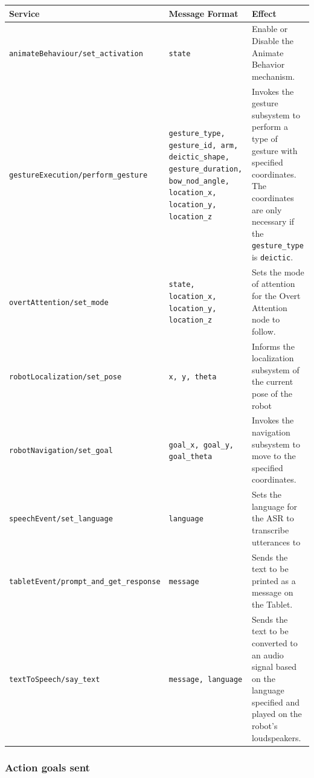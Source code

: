 \documentclass{CSSRforAfrica}
\begin{document}
\begin{center}
\begin{tabularx}{\linewidth}{| p{6.5cm} | p{3cm} | X |}
\hline 
{\small Service }                               & {\small Message Format }                            &  {\small Effect}       \\
\hline
{\footnotesize \verb+animateBehaviour/set_activation+}  & {\footnotesize \texttt{state}}    & {\small Enable or Disable the Animate Behavior mechanism.} \\ 
\hline
{\footnotesize \verb+gestureExecution/perform_gesture+}  & {\footnotesize \texttt{gesture\_type, gesture\_id, arm, deictic\_shape, gesture\_duration, bow\_nod\_angle, location\_x, location\_y, location\_z}}    & {\small Invokes the gesture subsystem to perform a type of gesture with specified coordinates. The coordinates are only necessary if the \texttt{gesture\_type} is \texttt{deictic}.} \\ 
\hline
{\footnotesize \verb+overtAttention/set_mode+}  & {\footnotesize \texttt{state, location\_x, location\_y, location\_z}}    & {\small Sets the mode of attention for the Overt Attention node to follow.} \\ 
\hline
{\footnotesize \verb+robotLocalization/set_pose+}  & {\footnotesize \texttt{x, y, theta}}    & {\small Informs the localization subsystem of the current pose of the robot} \\ 
\hline
{\footnotesize \verb+robotNavigation/set_goal+}  & {\footnotesize \texttt{goal\_x, goal\_y, goal\_theta}}    & {\small Invokes the navigation subsystem to move to the specified coordinates.} \\ 
\hline
{\footnotesize \verb+speechEvent/set_language+}  & {\footnotesize \texttt{language}}    & {\small Sets the language for the ASR to transcribe utterances to} \\ 
\hline
{\footnotesize \verb+tabletEvent/prompt_and_get_response+}  & {\footnotesize \texttt{message}}    & {\small Sends the text to be printed as a message on the Tablet.} \\ 
\hline
{\footnotesize \verb+textToSpeech/say_text+}  & {\footnotesize \texttt{message, language}}    & {\small Sends the text to be converted to an audio signal based on the language specified and played on the robot's loudspeakers.} \\ 
\hline
\end{tabularx}
\end{center}

\subsubsection*{Action goals sent}
\label{section:robot_mission_interpreter_goals_sent}
\end{document}
